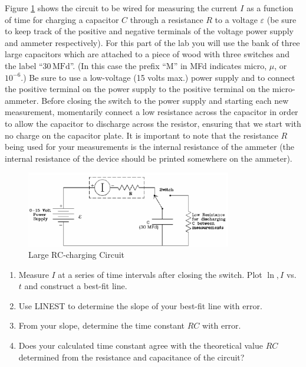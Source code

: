 Figure \ref{fig:largerccharge} shows the circuit to be wired for measuring the current $I$ as a function of time for charging a capacitor $C$ through a resistance $R$ to a voltage $\varepsilon$ (be sure to keep track of the positive and negative terminals of the voltage power supply and ammeter respectively).  For this part of the lab you will use the bank of three large capacitors which are attached to a piece of wood with three switches and the label ``$30\,\mathrm{MFd}$''. (In this case the prefix ``M'' in MFd indicates micro, $\mu$, or $10^{-6}$.) Be sure to use a low-voltage (15 volts max.) power supply and to connect the positive terminal on the power supply to the positive terminal on the micro-ammeter. Before closing the switch to the power supply and starting each new measurement, momentarily connect a low resistance across the capacitor in order to allow the capacitor to discharge across the resistor, ensuring that we start with no charge on the capacitor plate. It is important to note that the resistance $R$ being used for your measurements is the internal resistance of the ammeter (the internal resistance of the device should be printed somewhere on the ammeter).\myskip
\begin{figure}[h]
   \begin{center}
       \includegraphics[width=0.8\textwidth]{./Exp3/pic/image6.png}
   \end{center}
   \caption{Large RC-charging Circuit}
   \label{fig:largerccharge}
\end{figure}

\begin{enumerate}
  \item Measure $I$ at a series of time intervals after closing the switch. Plot $\ln,I$ vs. $t$ and construct a best-fit line.
  \item Use LINEST to determine the slope of your best-fit line with error.
  \item From your slope, determine the time constant $RC$ with error.
  \item Does your calculated time constant agree with the theoretical value $RC$ determined from the resistance and capacitance of the circuit?
\end{enumerate}

